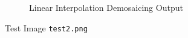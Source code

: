 \documentclass[12pt]{article}
\begin{document}
\begin{figure}[htp]
\begin{subfigure}[b]{0.6\textwidth}
        \caption{Linear Interpolation Demosaicing Output}
        \label{fig:test2_interp}
    \end{subfigure}
       \caption{Test Image \texttt{test2.png}}
       \label{fig:test2}
\end{figure}







\end{document}

